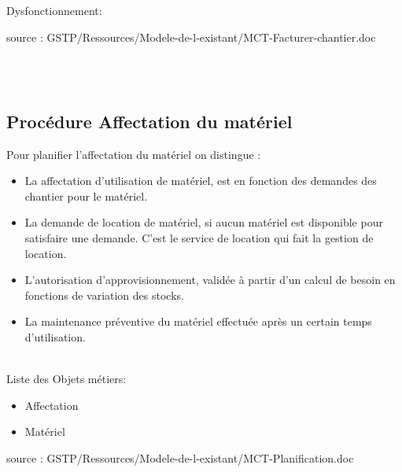 \documentclass [a4paper] {report}
\begin{document}
Dysfonctionnement:

source : GSTP/Ressources/Modele-de-l-existant/MCT-Facturer-chantier.doc

\hfill\\
\hfill\\
\subsection{Procédure Affectation du matériel}

	Pour planifier l'affectation du matériel on distingue :\\
	\begin{itemize}
		\item La affectation d'utilisation de matériel, est en fonction des demandes des chantier pour le matériel.\\
		\item La demande de location de matériel, si aucun matériel est disponible pour satisfaire une demande. C'est le service de location qui fait la gestion de location.\\
		\item L'autorisation d'approvisionnement, validée à partir d'un calcul de besoin en fonctions de variation des stocks.\\
		\item La maintenance préventive du matériel effectuée après un certain temps d'utilisation.\\
	\end{itemize}
\hfill\\
Liste des Objets métiers:\\
\begin{itemize}
	\item	Affectation\\
	\item Matériel\\
\end{itemize}


source : GSTP/Ressources/Modele-de-l-existant/MCT-Planification.doc



\hfil\\
\end{document}
